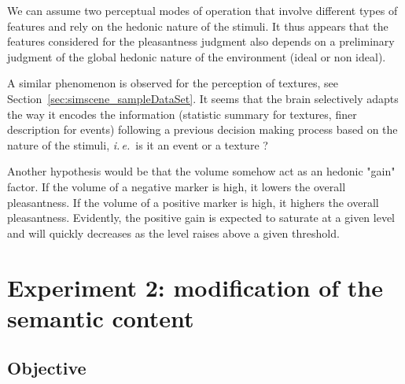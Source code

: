 \documentclass[12pt]{elsarticle}
\newcommand{\ie}{\emph{i.\,e.}}
\begin{document}
We can assume two perceptual modes of operation that involve different types of features and rely on the hedonic nature  of the stimuli. It thus appears that the features considered for the pleasantness judgment also depends on a preliminary judgment of the global hedonic nature of the environment (ideal or non ideal).

A similar phenomenon is observed for the perception of textures, see Section~\ref{sec:simscene_sampleDataSet}. It seems that the brain selectively adapts the way it encodes the information (statistic summary for textures, finer description for events) following a previous decision making process based on the nature of the stimuli, \ie~is it an event or a texture ?


Another hypothesis would be that the volume somehow act as an hedonic "gain" factor. If the volume of a negative marker is high, it lowers the overall pleasantness. If the volume of a positive marker is high, it highers the overall pleasantness. Evidently, the positive gain is expected to saturate at a given level and will quickly decreases as the level raises above a given threshold.


\section{Experiment 2: modification of the semantic content}
\label{sec:modification}

\subsection{Objective}

\end{document}
